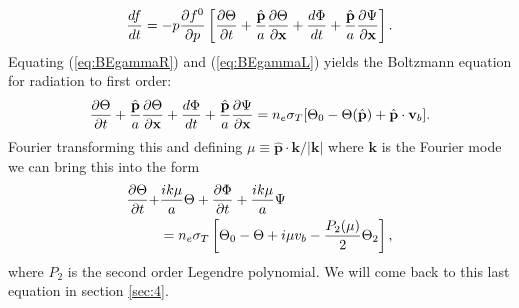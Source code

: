 \documentclass[%
reprint,
 amsmath,amssymb,
 aps,
]{revtex4-2}
\begin{document}
\begin{equation}
	\frac{df}{dt}=-p\pdv{f^0}{p}\left[\pdv{\Theta}{t}+\frac{\hat{\textbf{p}}}{a}\pdv{\Theta}{\textbf{x}}+\frac{d\Phi}{dt}+\frac{\hat{\textbf{p}}}{a}\pdv{\Psi}{\textbf{x}} \right].
	\label{eq:BEgammaL}
\end{equation}
Equating (\ref{eq:BEgammaR}) and (\ref{eq:BEgammaL}) yields the Boltzmann equation for radiation to first order:
\begin{equation}
	\pdv{\Theta}{t}+\frac{\hat{\textbf{p}}}{a}\pdv{\Theta}{\textbf{x}}+\frac{d\Phi}{dt}+\frac{\hat{\textbf{p}}}{a}\pdv{\Psi}{\textbf{x}}=n_e\sigma_T[\Theta_0-\Theta(\hat {\textbf{p}})+\hat{\textbf{p}}\cdot\textbf{v}_b].
	\label{eq:BEgamma}
\end{equation}
Fourier transforming this and defining $\mu\equiv \hat{\textbf{p}}\cdot\textbf{k}/|\textbf{k}|$ where $\textbf{k}$ is the Fourier mode we can bring this into the form \cite{AST5220LectureNotes}
\begin{align}
	\pdv{\Theta}{t}+&\frac{ik\mu}{a}\Theta+\pdv{\Phi}{t}+\frac{ik\mu}{a}\Psi\nonumber\\
	&=n_e\sigma_T\left[\Theta_0-\Theta+i\mu v_b-\frac{P_2(\mu)}{2}\Theta_2\right],
	\label{eq:LOS_thingy}
\end{align}
where $P_2$ is the second order Legendre polynomial. We will come back to this last equation in section \ref{sec:4}.
\end{document}
